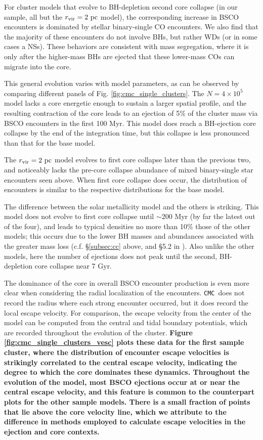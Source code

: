 \documentclass[twocolumn]{aastex631}
\newcommand{\CMC}{\texttt{CMC}}
\begin{document}
For cluster models that evolve to BH-depletion second core collapse (in our sample, all but the $r_{\rm vir} = 2~{\rm pc}$ model), the corresponding increase in BSCO encounters is dominated by stellar binary-single CO encounters.
We also find that the majority of these encounters do not involve BHs, but rather WDs (or in some cases a NSs).
These behaviors are consistent with mass segregation, where it is only after the higher-mass BHs are ejected that these lower-mass COs can migrate into the core.

This general evolution varies with model parameters, as can be observed by comparing different panels of Fig. \ref{fig:cmc_single_clusters}.
The $N = 4 \times 10^5$ model lacks a core energetic enough to sustain a larger spatial profile, and the resulting contraction of the core leads to an ejection of 5\% of the cluster mass via BSCO encounters in the first 100 Myr.
This model does reach a BH-ejection core collapse by the end of the integration time, but this collapse is less pronounced than that for the base model.

The $r_{\rm vir} = 2~{\rm pc}$ model evolves to first core collapse later than the previous two, and noticeably lacks the pre-core collapse abundance of mixed binary-single star encounters seen above.
When first core collapse does occur, the distribution of encounters is similar to the respective distributions for the base model.

The difference between the solar metallicity model and the others is striking.
This model does not evolve to first core collapse until $\sim$200 Myr (by far the latest out of the four), and leads to typical densities no more than 10\% those of the other models; this occurs due to the lower BH masses and abundances associated with the greater mass loss (c.f. \S\ref{subsec:cc} above, and \S5.2 in \citet{2022arXiv220316547R}).
Also unlike the other models, here the number of ejections does not peak until the second, BH-depletion core collapse near 7 Gyr.

The dominance of the core in overall BSCO encounter production is even more clear when considering the radial localization of the encounters.
\CMC\ does not record the radius where each strong encounter occurred, but it does record the local escape velocity.
For comparison, the escape velocity from the center of the model can be computed from the central and tidal boundary potentials, which are recorded throughout the evolution of the cluster.
\textbf{
    Figure \ref{fig:cmc_single_clusters_vesc} plots these data for the first sample cluster, where the distribution of encounter escape velocities is strikingly correlated to the central escape velocity, indicating the degree to which the core dominates these dynamics.
    Throughout the evolution of the model, most BSCO ejections occur at or near the central escape velocity, and this feature is common to the counterpart plots for the other sample models.
    There is a small fraction of points that lie above the core velocity line, which we attribute to the difference in methods employed to calculate escape velocities in the ejection and core contexts.
}
\end{document}
